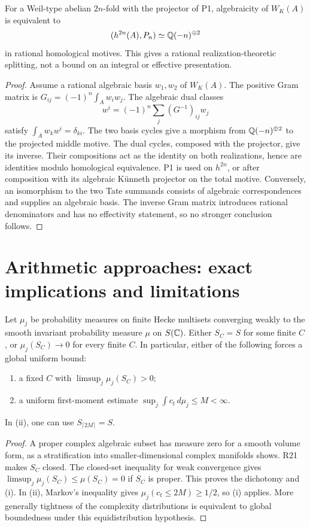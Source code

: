 \begin{proposition}\label{P5}
For a Weil-type abelian $2n$-fold with the projector of P1, algebraicity of $W_K(A)$ is equivalent to
\[
 (h^{2n}(A),P_n)\simeq\mathbb Q(-n)^{\oplus2}
\]
in rational homological motives. This gives a rational realization-theoretic splitting, not a bound on an integral or effective presentation.
\end{proposition}
\begin{proof}
Assume a rational algebraic basis $w_1,w_2$ of $W_K(A)$. The positive Gram matrix is $G_{ij}=(-1)^n\int_Aw_iw_j$. The algebraic dual classes
\[
 w^i=(-1)^n\sum_j(G^{-1})_{ij}w_j
\]
satisfy $\int_Aw_kw^i=\delta_{ki}$. The two basis cycles give a morphism from $\mathbb Q(-n)^{\oplus2}$ to the projected middle motive. The dual cycles, composed with the projector, give its inverse. Their compositions act as the identity on both realizations, hence are identities modulo homological equivalence. P1 is used on $h^{2n}$, or after composition with its algebraic K\"unneth projector on the total motive. Conversely, an isomorphism to the two Tate summands consists of algebraic correspondences and supplies an algebraic basis. The inverse Gram matrix introduces rational denominators and has no effectivity statement, so no stronger conclusion follows.
\end{proof}

\section{Arithmetic approaches: exact implications and limitations}\label{sec:arithmetic}
\begin{proposition}\label{A1}
Let $\mu_j$ be probability measures on finite Hecke multisets converging weakly to the smooth invariant probability measure $\mu$ on $S(\mathbb C)$. Either $S_C=S$ for some finite $C$, or $\mu_j(S_C)\to0$ for every finite $C$. In particular, either of the following forces a global uniform bound:
\begin{enumerate}[label=(\roman*)]
\item a fixed $C$ with $\limsup_j\mu_j(S_C)>0$;
\item a uniform first-moment estimate $\sup_j\int c_t\,d\mu_j\le M<\infty$.
\end{enumerate}
In (ii), one can use $S_{\lceil2M\rceil}=S$.
\end{proposition}
\begin{proof}
A proper complex algebraic subset has measure zero for a smooth volume form, as a stratification into smaller-dimensional complex manifolds shows. R21 makes $S_C$ closed. The closed-set inequality for weak convergence gives
$\limsup_j\mu_j(S_C)\le\mu(S_C)=0$ if $S_C$ is proper. This proves the dichotomy and (i). In (ii), Markov's inequality gives $\mu_j(c_t\le2M)\ge1/2$, so (i) applies. More generally tightness of the complexity distributions is equivalent to global boundedness under this equidistribution hypothesis.
\end{proof}

